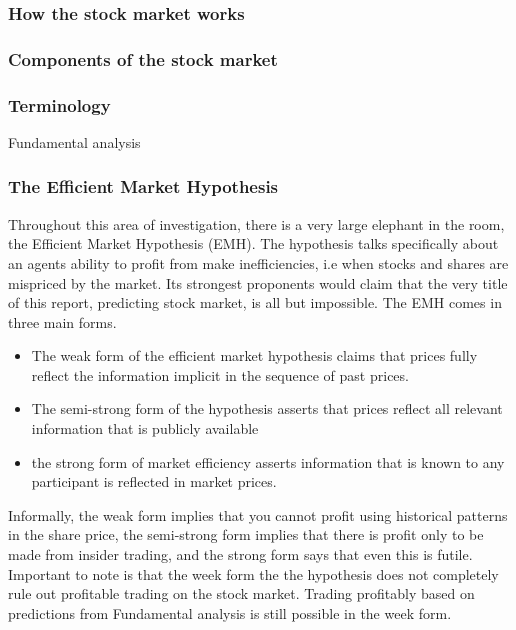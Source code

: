 \documentclass{report}
\begin{document}
\subsubsection{How the stock market works}
\subsubsection{Components of the stock market}
\subsubsection{Terminology}

Fundamental analysis

\subsubsection{The Efficient Market Hypothesis}

Throughout this area of investigation, there is a very large elephant in the room, the Efficient Market Hypothesis (EMH). The hypothesis talks specifically about an agents ability to profit from make inefficiencies, i.e when stocks and shares are mispriced by the market. Its strongest proponents would claim that the very title of this report, predicting stock market, is all but impossible. The EMH comes in three main forms.
\begin{itemize}
  \item The weak form of the efficient market hypothesis claims that prices fully
reflect the information implicit in the sequence of past prices. 

  \item The semi-strong form of the hypothesis asserts that prices reflect all relevant information that is publicly available
  
  \item the strong form of market efficiency asserts information that is known to any participant is reflected in market prices.
\end{itemize}
\cite{dimson1998brief}

Informally, the weak form implies that you cannot profit using historical patterns in the share price, the semi-strong form implies that there is profit only to be made from insider trading, and the strong form says that even this is futile. Important to note is that the week form the the hypothesis does not completely rule out profitable trading on the stock market. Trading profitably based on predictions from Fundamental analysis is still possible in the week form. 
\end{document}
